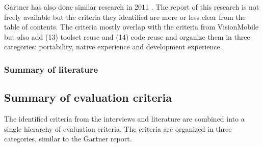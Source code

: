 Gartner has also done similar research in 2011 \cite{Gartner:CPT:2011}. The report of this research is not freely available but the criteria they identified are more or less clear from the table of contents. The criteria mostly overlap with the criteria from VisionMobile but also add (13) toolset reuse and (14) code reuse and organize them in three categories: portability, native experience and development experience.

\subsubsection*{Summary of literature}


\subsection*{Summary of evaluation criteria}

The identified criteria from the interviews and literature are combined into a single hierarchy of evaluation criteria. The criteria are organized in three categories, similar to the Gartner report.

